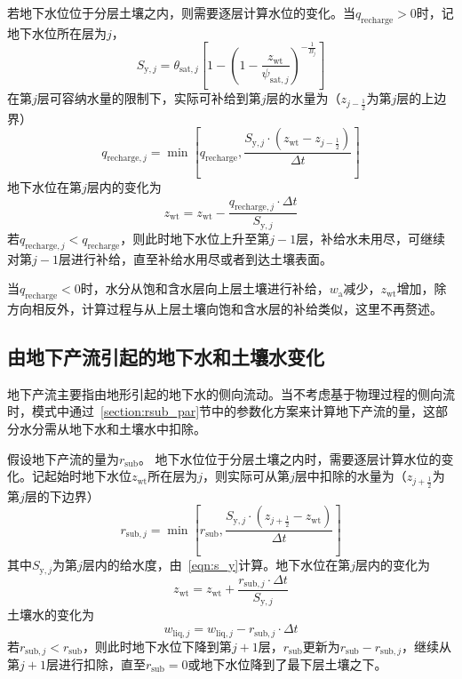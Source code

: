 若地下水位位于分层土壤之内，则需要逐层计算水位的变化。当$q_{\mathrm{recharge}}>0$时，记地下水位所在层为$j$，
\begin{equation}
  {S}_{\mathrm{y},j}=\theta_{\mathrm{sat},j}\left[1-\left(1-\frac{z_{\mathrm{wt}}}{\psi_{\mathrm{sat},j}}\right)^{-\frac{1}{B_j}}\right]
\end{equation}
在第$j$层可容纳水量的限制下，实际可补给到第$j$层的水量为（$z_{j-\frac{1}{2}}$为第$j$层的上边界）
\begin{equation}
  q_{\mathrm{recharge},j}=\min \left[q_{\mathrm{recharge}}, \frac{S_{\mathrm{y},j} \cdot \left(z_{\mathrm{w t}}-z_{j-\frac{1}{2}}\right)}{\Delta t} \right]
\end{equation}
地下水位在第$j$层内的变化为
\begin{equation}
  z_{\mathrm{w t}}=z_{\mathrm{w t}}-\frac{q_{\mathrm{recharge},j} \cdot \Delta t}{S_{\mathrm{y},j}}
\end{equation}
若$q_{\mathrm{recharge},j}<q_{\mathrm{recharge}}$，则此时地下水位上升至第$j-1$层，补给水未用尽，可继续对第$j-1$层进行补给，直至补给水用尽或者到达土壤表面。

当$q_{\mathrm{recharge}}<0$时，水分从饱和含水层向上层土壤进行补给，$w_{\mathrm {a}} $减少，$z_{\mathrm{wt}}$增加，除方向相反外，计算过程与从上层土壤向饱和含水层的补给类似，这里不再赘述。

\subsection{由地下产流引起的地下水和土壤水变化}

地下产流主要指由地形引起的地下水的侧向流动。当不考虑基于物理过程的侧向流时，模式中通过~\ref{section:rsub_par}节中的参数化方案来计算地下产流的量，这部分水分需从地下水和土壤水中扣除。

假设地下产流的量为$r_{\mathrm{sub}}$。
地下水位位于分层土壤之内时，需要逐层计算水位的变化。记起始时地下水位$z_{\mathrm{wt}}$所在层为$j$，则实际可从第$j$层中扣除的水量为（$z_{j+\frac{1}{2}}$为第$j$层的下边界）
\begin{equation}
  r_{\mathrm{sub},j} = \min \left[r_{\mathrm{sub}}, \frac{S_{\mathrm{y},j} \cdot \left(z_{j+\frac{1}{2}} - z_{\mathrm{w t}}\right)}{\Delta t} \right]
\end{equation}
其中$S_{\mathrm{y},j}$为第$j$层内的给水度，由~\eqref{eqn:s_y}计算。地下水位在第$j$层内的变化为
\begin{equation}
  z_{\mathrm{w t}}=z_{\mathrm{w t}}+\frac{r_{\mathrm{sub},j} \cdot \Delta t}{S_{\mathrm{y},j}}
\end{equation}
土壤水的变化为
\begin{equation}
  w_{\mathrm{liq},j} =  w_{\mathrm{liq},j} - r_{\mathrm{sub},j} \cdot \Delta t
\end{equation}
若$r_{\mathrm{sub},j}<r_{\mathrm{sub}}$，则此时地下水位下降到第$j+1$层，$r_{\mathrm{sub}}$更新为$r_{\mathrm{sub}}-r_{\mathrm{sub},j}$，继续从第$j+1$层进行扣除，直至$r_{\mathrm{sub}}=0$或地下水位降到了最下层土壤之下。

